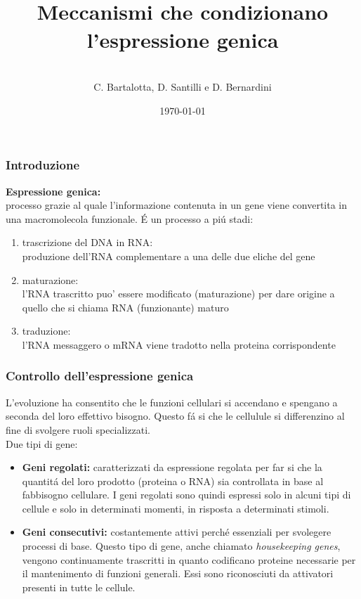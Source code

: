 \documentclass[hyperref={pdfpagelabels=false}]{beamer}
\title{\\Meccanismi che condizionano l'espressione genica\\}
\author{\\ C. Bartalotta, D. Santilli e D. Bernardini}
\date{\today}
\begin{document}


\begin{frame}
\titlepage
\end{frame} 


\begin{frame}\frametitle{Introduzione}
\textbf{Espressione genica:}\\
processo grazie al quale l'informazione contenuta in un gene viene convertita in una macromolecola funzionale.
\'E un processo a pi\'u stadi:\pause 
\begin{enumerate}
\item trascrizione del DNA in RNA:\\
produzione dell'RNA complementare a una delle due eliche del gene  \pause 
\item maturazione:\\
l'RNA trascritto puo' essere modificato (maturazione) per dare origine a quello che si chiama RNA (funzionante) maturo \pause 
\item traduzione:\\
l'RNA messaggero o mRNA viene tradotto nella proteina corrispondente
\end{enumerate}
\end{frame}


\begin{frame}\frametitle{Controllo dell'espressione genica}
L'evoluzione ha consentito che le funzioni cellulari si accendano e spengano a seconda del loro effettivo bisogno. Questo f\'a si che le cellulule si differenzino al fine di svolgere ruoli specializzati.
\\
Due tipi di gene:
\begin{itemize}
\item \textbf{Geni regolati:}  caratterizzati da espressione regolata per far si che la quantit\'a del loro prodotto (proteina o RNA) sia controllata in base al fabbisogno cellulare. I geni regolati sono quindi espressi solo in alcuni tipi di cellule e solo in determinati momenti, in risposta a determinati stimoli.
\item \textbf{Geni consecutivi:} costantemente attivi perch\'e essenziali per svolegere processi di base. Questo tipo di gene, anche chiamato \emph{housekeeping genes}, vengono continuamente trascritti in quanto codificano proteine necessarie per il mantenimento di funzioni generali. Essi sono riconosciuti da attivatori  presenti in tutte le 
cellule.
\end{itemize}
\end{frame}
\end{document}
